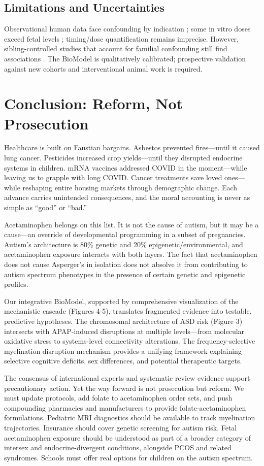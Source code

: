 \documentclass[12pt]{article}
\begin{document}
\subsection{Limitations and Uncertainties}
Observational human data face confounding by indication \citep{liew2016}; some in vitro doses exceed fetal levels \citep{perez2012}; timing/dose quantification remains imprecise. However, sibling-controlled studies that account for familial confounding still find associations \citep{brandlistuen2013,stergiakouli2016}. The BioModel is qualitatively calibrated; prospective validation against new cohorts and interventional animal work is required.

\section{Conclusion: Reform, Not Prosecution}

Healthcare is built on Faustian bargains. Asbestos prevented fires---until it caused lung cancer. Pesticides increased crop yields---until they disrupted endocrine systems in children. mRNA vaccines addressed COVID in the moment---while leaving us to grapple with long COVID. Cancer treatments save loved ones---while reshaping entire housing markets through demographic change. Each advance carries unintended consequences, and the moral accounting is never as simple as ``good'' or ``bad.''

Acetaminophen belongs on this list. It is not the cause of autism, but it may be a cause---an override of developmental programming in a subset of pregnancies. Autism's architecture is 80\% genetic and 20\% epigenetic/environmental, and acetaminophen exposure interacts with both layers. The fact that acetaminophen does not cause Asperger's in isolation does not absolve it from contributing to autism spectrum phenotypes in the presence of certain genetic and epigenetic profiles.

Our integrative BioModel, supported by comprehensive visualization of the mechanistic cascade (Figures 4-5), translates fragmented evidence into testable, predictive hypotheses. The chromosomal architecture of ASD risk (Figure 3) intersects with APAP-induced disruptions at multiple levels---from molecular oxidative stress to systems-level connectivity alterations. The frequency-selective myelination disruption mechanism provides a unifying framework explaining selective cognitive deficits, sex differences, and potential therapeutic targets.

The consensus of international experts \citep{bauer2021} and systematic review evidence \citep{navarro2025, masarwa2018} support precautionary action. Yet the way forward is not prosecution but reform. We must update protocols, add folate to acetaminophen order sets, and push compounding pharmacies and manufacturers to provide folate-acetaminophen formulations. Pediatric MRI diagnostics should be available to track myelination trajectories. Insurance should cover genetic screening for autism risk. Fetal acetaminophen exposure should be understood as part of a broader category of intersex and endocrine-divergent conditions, alongside PCOS and related syndromes. Schools must offer real options for children on the autism spectrum.
\end{document}
